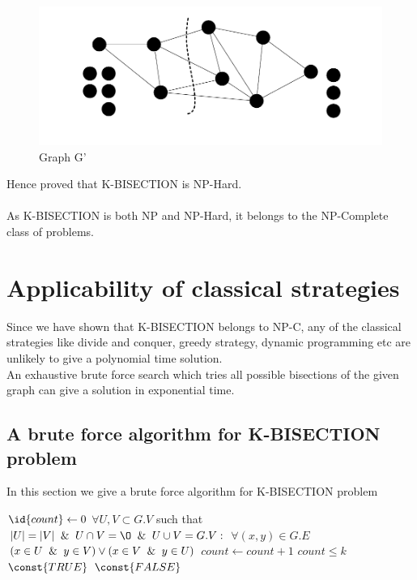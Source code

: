 \documentclass[10pt]{article}
\begin{document}
\begin{figure}[h!]
    \includegraphics[width=\linewidth]{g_dash.png}
    \caption{Graph G'}
    \label{fig:G'}
\end{figure}

Hence proved that K-BISECTION is NP-Hard. \\\\
As K-BISECTION is both NP and NP-Hard, it belongs to the NP-Complete class of problems.

\section{Applicability of classical strategies}
Since we have shown that K-BISECTION belongs to NP-C, any of the classical  strategies like divide and conquer, greedy strategy, dynamic programming etc are unlikely to give a polynomial time solution.\\
An exhaustive brute force search which tries all possible bisections of the given graph can give a solution in exponential time.

\subsection{A brute force algorithm for K-BISECTION problem}

In this section we give a brute force algorithm for K-BISECTION problem

\begin{codebox}

\li $\id{count} \gets 0$ 
\li \For $\forall U,V \subset  G.V$ such that $|U| = |V| \And U \cap V = \O  \And U \cup V = G.V :$  \Do
\li      \For $\forall (x,y) \in  G.E$ \Do  
\li         \If $ (x \in U \And y \in V) \lor (x \in V \And y \in U)$\Then   
\li              $count \gets count + 1$
            \End
        \End
\li     \If $count \leq k$\Then   
\li             \Return $\const{TRUE}$
        \End
    \End
\li \Return $\const{FALSE}$
\end{codebox}
\end{document}

